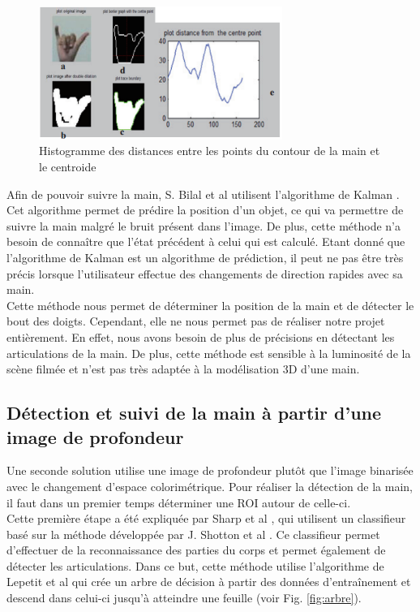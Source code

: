 \begin{figure}[!h]
\center
\includegraphics[width=300px]{images/handHisto.png}
\caption{Histogramme des distances entre les points du contour de la main et le centroide}
\label{fig:handHisto}
\end{figure}

Afin de pouvoir suivre la main, S. Bilal et al \cite{haarlike} utilisent l'algorithme de Kalman \cite{kalman}.
Cet algorithme permet de prédire la position d'un objet, ce qui va permettre de suivre la main malgré
le bruit présent dans l'image. De plus, cette méthode n'a besoin de connaître que l'état précédent à celui 
qui est calculé. Etant donné que l'algorithme de Kalman est un algorithme de prédiction, il peut ne pas être très
précis lorsque l'utilisateur effectue des changements de direction rapides avec sa main.\\

Cette méthode nous permet de déterminer la position de la main et de détecter le bout des doigts. Cependant, elle ne nous permet
pas de réaliser notre projet entièrement. En effet, nous avons besoin de plus de précisions en détectant les articulations
de la main. De plus, cette méthode est sensible à la luminosité de la scène filmée et n'est pas très adaptée
à la modélisation 3D d'une main.

\subsection{Détection et suivi de la main à partir d'une image de profondeur}
Une seconde solution utilise une image de profondeur plutôt que l'image binarisée avec le changement d'espace colorimétrique.
Pour réaliser la détection de la main, il faut dans un premier temps déterminer une ROI
autour de celle-ci.\\ 

Cette première étape a été expliquée par Sharp et al \cite{export:238453}, qui utilisent un classifieur
basé sur la méthode développée par J. Shotton et al \cite{export:145347}. Ce classifieur permet d'effectuer de la reconnaissance
des parties du corps et permet également de détecter les articulations. Dans ce but, cette méthode utilise l'algorithme de Lepetit et al
\cite{lepetit2005randomized} qui crée un arbre de décision à partir des données d'entraînement et descend dans celui-ci
jusqu'à atteindre une feuille (voir Fig. \ref{fig:arbre}).\\

